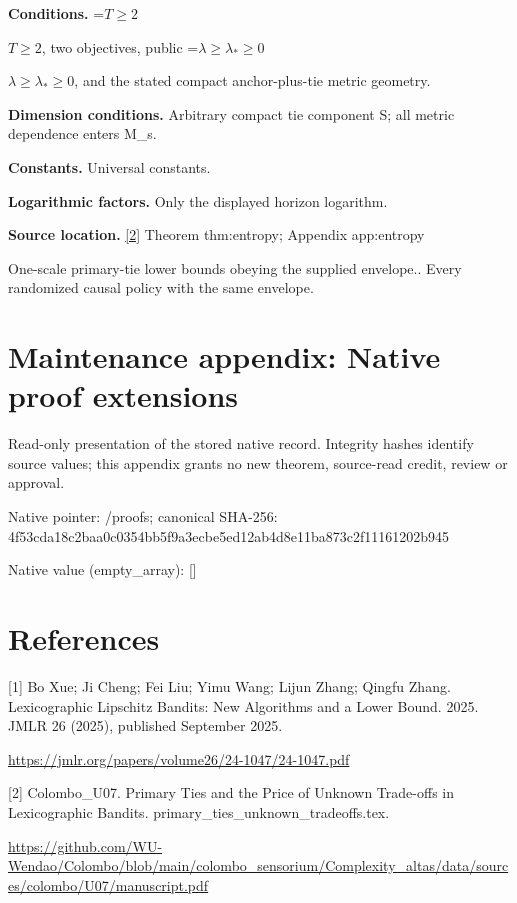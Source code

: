 \documentclass[10pt,a4paper]{article}
\newcommand{\AtlasMath}[1]{\par\begingroup\centering\setbox0=\hbox{$\displaystyle #1$}\ifdim\wd0>1.4\linewidth\typeout{ATLAS WIDE FORMULA: \the\wd0}\fi\ifdim\wd0>\linewidth\resizebox{\linewidth}{!}{\box0}\else\box0\fi\par\endgroup}
\newcommand{\AtlasInlineMath}[1]{\begingroup\setbox0=\hbox{$#1$}\ifdim\wd0>.4\linewidth\endgroup\AtlasMath{#1}\else\endgroup$#1$\fi}
\begin{document}
\textbf{Conditions.} \AtlasInlineMath{T\ge2}, two objectives, public \AtlasInlineMath{\lambda\ge\lambda_*\ge0}, and the stated compact anchor-plus-tie metric geometry.



\textbf{Dimension conditions.} Arbitrary compact tie component S; all metric dependence enters M\_s.



\textbf{Constants.} Universal constants.



\textbf{Logarithmic factors.} Only the displayed horizon logarithm.



\textbf{Source location.} \href{https://github.com/WU-Wendao/Colombo/blob/main/colombo_sensorium/Complexity_altas/data/sources/colombo/U07/manuscript.pdf}{[2]} Theorem thm:entropy; Appendix app:entropy



One-scale primary-tie lower bounds obeying the supplied envelope.. Every randomized causal policy with the same envelope.



\section{Maintenance appendix: Native proof extensions}


Read-only presentation of the stored native record. Integrity hashes identify source values; this appendix grants no new theorem, source-read credit, review or approval.



Native pointer: /proofs; canonical SHA-256: 4f53cda18c2baa0c0354bb5f\allowbreak{}9a3ecbe5ed12ab4d8e11ba87\allowbreak{}3c2f11161202b945



Native value (empty\_array): []



\section{References}


[1] Bo Xue; Ji Cheng; Fei Liu; Yimu Wang; Lijun Zhang; Qingfu Zhang. Lexicographic Lipschitz Bandits: New Algorithms and a Lower Bound. 2025. JMLR 26 (2025), published September 2025.



\url{https://jmlr.org/papers/volume26/24-1047/24-1047.pdf}



[2] Colombo\_U07. Primary Ties and the Price of Unknown Trade-offs in Lexicographic Bandits. primary\_ties\_unknown\_tradeoffs.tex.



\url{https://github.com/WU-Wendao/Colombo/blob/main/colombo_sensorium/Complexity_altas/data/sources/colombo/U07/manuscript.pdf}
\end{document}
